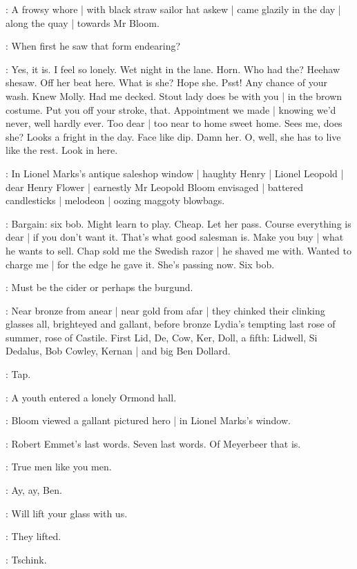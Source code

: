:
A frowsy whore |
with black straw sailor hat askew |
came glazily in the day |
along the quay |
towards Mr Bloom.

:
When first he saw that form endearing?

\BloomInt:
Yes,
it is.
I feel so lonely.
Wet night in the lane.
Horn.
Who had the?
Heehaw shesaw.
Off her beat here.
What is she?
Hope she.
Psst!
Any chance of your wash.
Knew Molly.
Had me decked.
Stout lady does be with you |
in the brown costume.
Put you off your stroke,
that.
Appointment we made |
knowing we'd never,
well hardly ever.
Too dear |
too near to home sweet home.
Sees me,
does she?
Looks a fright in the day.
Face like dip.
Damn her.
O,
well,
she has to live like the rest.
Look in here.

:
In Lionel Marks's antique saleshop window |
haughty Henry |
Lionel Leopold |
dear Henry Flower |
earnestly Mr Leopold Bloom envisaged |
battered candlesticks |
melodeon |
oozing maggoty blowbags.

\BloomInt:
Bargain:
six bob.
Might learn to play.
Cheap.
Let her pass.
Course everything is dear |
if you don't want it.
That's what good salesman is.
Make you buy |
what he wants to sell.
Chap sold me the Swedish razor |
he shaved me with.
Wanted to charge me |
for the edge he gave it.
She's passing now.
Six bob.

\BloomInt:
Must be the cider or perhaps the burgund.

:
Near bronze from anear |
near gold from afar |
they chinked their clinking glasses all,
brighteyed and gallant,
before bronze Lydia's tempting
last rose of summer,
rose of Castile.
First Lid,
De,
Cow,
Ker,
Doll,
a fifth:
Lidwell,
Si Dedalus,
Bob Cowley,
Kernan |
and big Ben Dollard.

\stripling:
Tap.

:
A youth entered a lonely Ormond hall.

:
Bloom viewed a gallant pictured hero |
in Lionel Marks's window.

\BloomInt:
Robert Emmet's last words.
Seven last words.
Of Meyerbeer that is.

\dollard:
True men like you men.

\simon:
Ay,
ay,
Ben.

\dollard:
Will lift your glass with us.

:
They lifted.


:
Tschink.

